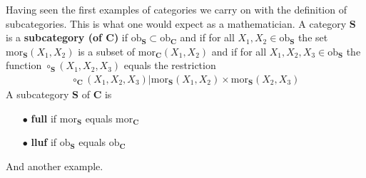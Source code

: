 Having seen the first examples of categories we carry on with the definition of
subcategories. This is what one would expect as a mathematician. A category $\mathbf{S}$ is a \textbf{subcategory (of $\mathbf{C}$)} if $\mathrm{ob}_{\mathbf{S}} \subset \mathrm{ob}_{\mathbf{C}}$ and if for all $X_{1},X_{2} \in \mathrm{ob}_{\mathbf{S}}$ the set $\mathrm{mor}_{\mathbf{S}}(X_{1},X_{2})$ is a subset of $\mathrm{mor}_{\mathbf{C}}(X_{1},X_{2})$ and if for all $X_{1},X_{2},X_{3} \in \mathrm{ob}_{\mathbf{S}}$ the function $\circ_{\mathbf{S}}(X_{1},X_{2},X_{3})$ equals the restriction
\begin{align*}
  \circ_{\mathbf{C}}(X_{1},X_{2},X_{3})
  \vert
  \mathrm{mor}_{\mathbf{S}}(X_{1},X_{2})
  \times
  \mathrm{mor}_{\mathbf{S}}(X_{2},X_{3})
\end{align*}
A subcategory $\mathbf{S}$ of $\mathbf{C}$ is
\begin{enumerate}
\item[$\bullet$]
\textbf{full} if $\mathrm{mor}_{\mathbf{S}}$ equals $\mathrm{mor}_{\mathbf{C}}$
\item[$\bullet$]
\textbf{lluf} if $\mathrm{ob}_{\mathbf{S}}$ equals $\mathrm{ob}_{\mathbf{C}}$
\end{enumerate}
And another example.
\\
